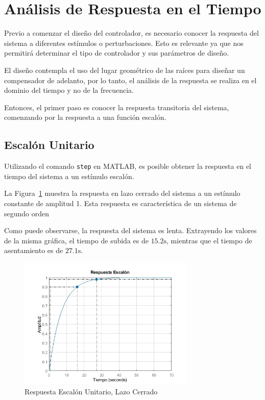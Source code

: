 \documentclass[12pt,a4paper]{article}
\begin{document}
    \pagebreak

    \section{Análisis de Respuesta en el Tiempo}

      Previo a comenzar el diseño del controlador, es necesario conocer la respuesta del sistema a diferentes 
      estímulos o perturbaciones. Esto es relevante ya que nos permitirá determinar el tipo de controlador 
      y sus parámetros de diseño. 

      El diseño contempla el uso del lugar geométrico de las raíces para diseñar un compensador de adelanto, por lo 
      tanto, el análisis de la respuesta se realiza en el dominio del tiempo y no de la frecuencia. 

      Entonces, el primer paso es conocer la respuesta transitoria del sistema, comenzando por la respuesta 
      a una función escalón. 

      \subsection{Escalón Unitario}
        
        Utilizando el comando \verb|step| en MATLAB, es posible obtener la respuesta en el tiempo del sistema 
        a un estímulo escalón.   

        La Figura~\ref{fig:response:closedLoopStep} muestra la respuesta en lazo cerrado del sistema a un 
        estímulo constante de amplitud 1. Esta respuesta es característica de un sistema de segundo orden

        Como puede observarse, la respuesta del sistema es lenta. Extrayendo los valores de la misma gráfica, 
        el tiempo de subida es de \(15.2\si{\second}\), mientras que el tiempo de asentamiento es 
        de \(27.1\si{\second}\).

        \begin{figure}%
          \centering
          \includegraphics[width=0.75\textwidth, keepaspectratio]{./Resources/ClosedLoopStep.jpg}
          \caption{Respuesta Escalón Unitario, Lazo Cerrado}
          \label{fig:response:closedLoopStep}
        \end{figure}
\end{document}
